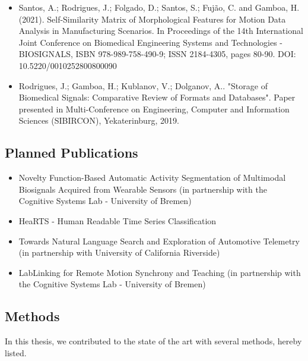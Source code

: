 \begin{itemize}
\item Santos, A.; Rodrigues, J.; Folgado, D.; Santos, S.; Fujão, C. and Gamboa, H. (2021). Self-Similarity Matrix of Morphological Features for Motion Data Analysis in Manufacturing Scenarios. In Proceedings of the 14th International Joint Conference on Biomedical Engineering Systems and Technologies - BIOSIGNALS, ISBN 978-989-758-490-9; ISSN 2184-4305, pages 80-90. DOI: 10.5220/0010252800800090

\item Rodrigues, J.; Gamboa, H.; Kublanov, V.; Dolganov, A.. "Storage of Biomedical Signals: Comparative Review of Formats and Databases". Paper presented in Multi-Conference on Engineering, Computer and Information Sciences (SIBIRCON), Yekaterinburg, 2019.

\end{itemize}

\subsection{Planned Publications}

\begin{itemize}
\item Novelty Function-Based Automatic Activity Segmentation of Multimodal Biosignals Acquired from Wearable Sensors (in partnership with the Cognitive Systems Lab - University of Bremen)

\item HeaRTS - Human Readable Time Series Classification

\item Towards Natural Language Search and Exploration of Automotive Telemetry (in partnership with University of California Riverside)

\item LabLinking for Remote Motion Synchrony and Teaching (in partnership with the Cognitive Systems Lab - University of Bremen)

\end{itemize}

\subsection{Methods}

In this thesis, we contributed to the state of the art with several methods, hereby listed.

